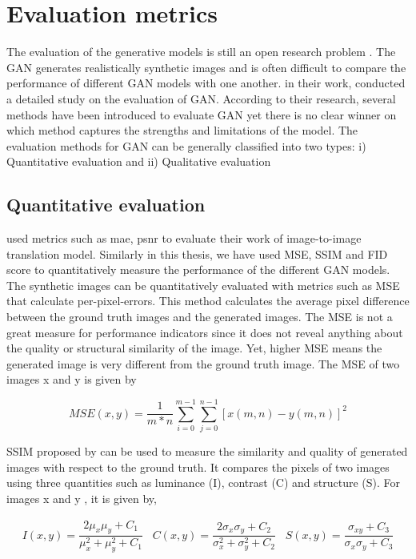 \section{Evaluation metrics}\label{sec:eval}
The evaluation of the generative models is still an open research problem \citep{salimans2016improved}. The GAN generates realistically synthetic images and is often difficult to compare the performance of different GAN models with one another. \cite{borji2019pros} in their work, conducted a detailed study on the evaluation of GAN. According to their research, several methods have been introduced to evaluate GAN  yet there is no clear winner on which method captures the strengths and limitations of the model.
	The evaluation methods for GAN can be generally classified into two types: i) Quantitative evaluation and ii) Qualitative  evaluation

\subsection{Quantitative evaluation}
\cite{yang2018mri} used metrics such as \gls{mae}, \gls{psnr} to evaluate their work of image-to-image translation model. Similarly in this thesis, we have used MSE, SSIM and FID score to quantitatively measure the performance of the different GAN models. The synthetic images can be quantitatively evaluated with metrics such as MSE that calculate per-pixel-errors. This method calculates the average pixel difference between the ground truth images and the generated images. The MSE is not a great measure for performance indicators since it does not reveal anything about the quality or structural similarity of the image. Yet, higher MSE means the generated image is very different from the ground truth image. The MSE of two images x and y is given by

\begin{equation*}
MSE(x,y) = \frac{1}{m*n}\sum_{i=0}^{m-1}\sum_{j=0}^{n-1}[x(m,n) - y(m,n)]^2
\end{equation*}

SSIM proposed by \cite{wang2004image} can be used to measure the similarity and quality of generated images with respect to the ground truth. It compares the pixels of two images using three quantities such as luminance (I), contrast (C) and structure (S). For images x and y , it is given by,

\begin{align*}
I(x,y) = \dfrac{2\mu_x\mu_y + C_1}{\mu^2_x + \mu^2_y + C_1} \;\;\;
C(x,y) = \dfrac{2\sigma_x\sigma_y + C_2}{\sigma^2_x + \sigma^2_y + C_2} \;\;\;
S(x,y) = \dfrac{\sigma_{xy} + C_3}{\sigma_x \sigma_y + C_3}
\end{align*}

